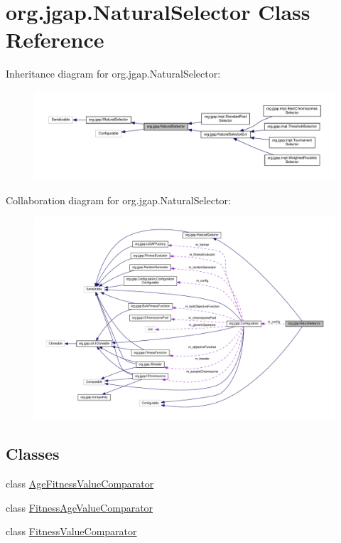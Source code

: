 \hypertarget{classorg_1_1jgap_1_1_natural_selector}{\section{org.\-jgap.\-Natural\-Selector Class Reference}
\label{classorg_1_1jgap_1_1_natural_selector}
}


Inheritance diagram for org.\-jgap.\-Natural\-Selector\-:
\nopagebreak
\begin{figure}[H]
\begin{center}
\leavevmode
\includegraphics[width=350pt]{classorg_1_1jgap_1_1_natural_selector__inherit__graph}
\end{center}
\end{figure}


Collaboration diagram for org.\-jgap.\-Natural\-Selector\-:
\nopagebreak
\begin{figure}[H]
\begin{center}
\leavevmode
\includegraphics[width=350pt]{classorg_1_1jgap_1_1_natural_selector__coll__graph}
\end{center}
\end{figure}
\subsection*{Classes}
\begin{DoxyCompactItemize}
\item 
class \hyperlink{classorg_1_1jgap_1_1_natural_selector_1_1_age_fitness_value_comparator}{Age\-Fitness\-Value\-Comparator}
\item 
class \hyperlink{classorg_1_1jgap_1_1_natural_selector_1_1_fitness_age_value_comparator}{Fitness\-Age\-Value\-Comparator}
\item 
class \hyperlink{classorg_1_1jgap_1_1_natural_selector_1_1_fitness_value_comparator}{Fitness\-Value\-Comparator}
\end{DoxyCompactItemize}
